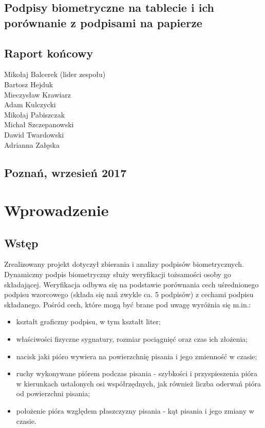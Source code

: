 \documentclass[notitlepage, oneside]{report}
\begin{document}
 
\vline\break
\begin{center}
\section*{{\LARGE Podpisy biometryczne na tablecie i ich porównanie  z podpisami na papierze}}
\section*{{\Large Raport końcowy}}

{\Large Mikołaj Balcerek (lider zespołu) \\ Bartosz Hejduk \\ Mieczysław Krawiarz \\ Adam Kulczycki \\ Mikołaj Pabiszczak \\ Michał Szczepanowski \\ Dawid Twardowski \\ Adrianna Załęska \\}
   
\section*{Poznań, wrzesień 2017}
\end{center}

\chapter*{Wprowadzenie}
 \section*{Wstęp}
 Zrealizowany projekt dotyczył zbierania i analizy podpisów biometrycznych. Dynamiczny podpis biometryczny służy weryfikacji tożsamości osoby go składającej. Weryfikacja odbywa się na podstawie porównania cech uśrednionego podpisu wzorcowego (składa się nań zwykle ca. 5 podpisów) z cechami podpisu składanego. Pośród cech, które mogą być brane pod uwagę wyróżnia się m.in.:
 \begin{itemize}
 	\item kształt graficzny podpisu, w tym kształt liter;
 	\item właściwości fizyczne sygnatury, rozmiar pociągnięć oraz czas ich złożenia;
 	\item nacisk jaki pióro wywiera na powierzchnię pisania i jego zmienność w czasie;
 	\item ruchy wykonywane piórem podczas pisania - szybkości i przyspieszenia pióra w kierunkach ustalonych osi współrzędnych, jak również liczba oderwań pióra od powierzchni pisania;
 	\item położenie pióra względem płaszczyzny pisania -  kąt pisania i jego zmiany w czasie.
 \end{itemize}
\end{document}
